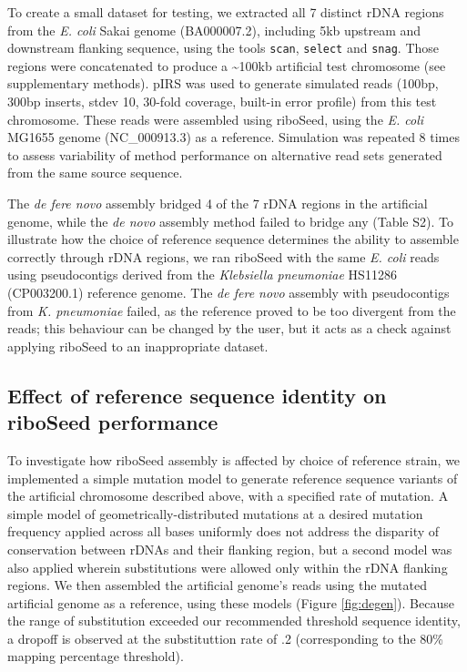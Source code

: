 \documentclass[a4,center,fleqn]{NAR}
\begin{document}
To create a small dataset for testing, we extracted all 7 distinct rDNA regions from the \textit{E. coli} Sakai genome (BA000007.2), including 5kb upstream and downstream flanking sequence, using the tools \texttt{scan}, \texttt{select} and \texttt{snag}. Those regions were concatenated to produce a \textasciitilde100kb artificial test chromosome (see supplementary methods). pIRS\cite{Hu2012} was used to generate simulated reads (100bp, 300bp inserts, stdev 10, 30-fold coverage, built-in error profile) from this test chromosome. These reads were assembled using riboSeed, using the \textit{E. coli} MG1655 genome (NC\_000913.3) as a reference.  Simulation was repeated 8 times to assess variability of method performance on alternative read sets generated from the same source sequence.


The \textit{de fere novo} assembly bridged 4 of the 7 rDNA regions in the artificial genome, while the \textit{de novo} assembly method failed to bridge any (Table S2). To illustrate how the choice of reference sequence determines the ability to assemble correctly through rDNA regions, we ran riboSeed with the same \textit{E. coli} reads using pseudocontigs derived from the \textit{Klebsiella pneumoniae} HS11286 (CP003200.1) reference genome\cite{Liu2012}. The \textit{de fere novo} assembly with pseudocontigs from \textit{K. pneumoniae} failed, as the reference proved to be too divergent from the reads; this behaviour can be changed by the user, but it acts as a check against applying riboSeed to an inappropriate dataset.


\subsection*{Effect of reference sequence identity on riboSeed performance}
To investigate how riboSeed assembly is affected by choice of reference strain, we implemented a simple mutation model to generate reference sequence variants of the artificial chromosome described above, with a specified rate of mutation. A simple model of geometrically-distributed mutations at a desired mutation frequency applied across all bases uniformly does not address the disparity of conservation between rDNAs and their flanking region, but a second model was also applied wherein substitutions were allowed only within the rDNA flanking regions. We then assembled the artificial genome's reads using the mutated artificial genome as a reference, using these models (Figure \ref{fig:degen}).  Because the range of substitution exceeded our recommended threshold sequence identity, a dropoff is observed at the  substituttion rate of .2 (corresponding to the 80\% mapping percentage threshold).
\end{document}
